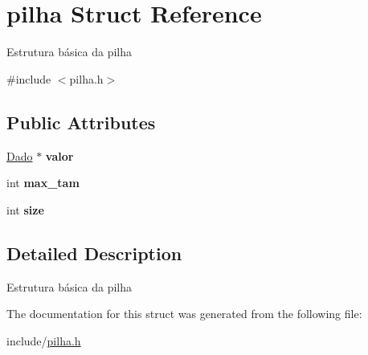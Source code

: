 \hypertarget{structpilha}{}\section{pilha Struct Reference}
\label{structpilha}


Estrutura básica da pilha ~\newline
  




{\ttfamily \#include $<$pilha.\+h$>$}

\subsection*{Public Attributes}
\begin{DoxyCompactItemize}
\item 
\mbox{\label{structpilha_a9fcf87d86e8f47d92d8e42341eb573b5}} 
\mbox{\hyperlink{pilha_8h_a5fc4fd986b888c946351fdd1c19309da}{Dado}} $\ast$ {\bfseries valor}
\item 
\mbox{\label{structpilha_a0b8a0715507edc1498e56c0007dc3d2d}} 
int {\bfseries max\+\_\+tam}
\item 
\mbox{\label{structpilha_ab6f3f9be9c7f94fd0630d4ab5552babe}} 
int {\bfseries size}
\end{DoxyCompactItemize}


\subsection{Detailed Description}
Estrutura básica da pilha ~\newline
 

The documentation for this struct was generated from the following file\+:\begin{DoxyCompactItemize}
\item 
include/\mbox{\hyperlink{pilha_8h}{pilha.\+h}}\end{DoxyCompactItemize}
